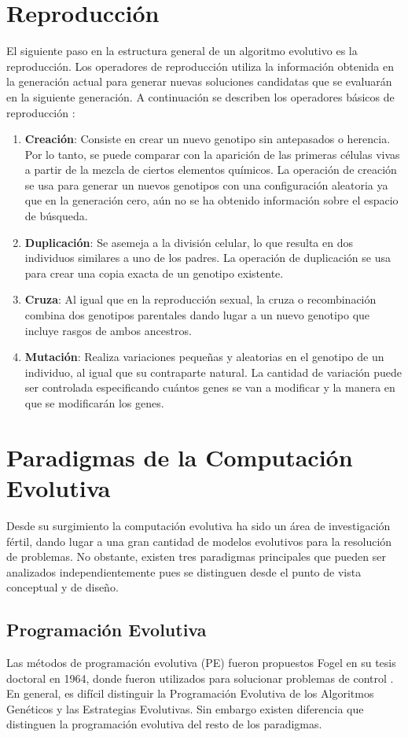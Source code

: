\section{Reproducción}\label{Reproduccion} 
El siguiente paso en la estructura general de un algoritmo evolutivo es la reproducción. Los operadores de reproducción utiliza la información obtenida en la generación actual para generar nuevas soluciones candidatas que se evaluarán en la siguiente generación. A continuación se describen los operadores básicos de reproducción \cite{weise2009global}:
\begin{enumerate}
\item \textbf{Creación}: Consiste en crear un nuevo genotipo sin antepasados o herencia. Por lo tanto, se puede comparar con la aparición de las primeras células vivas a partir de la mezcla de ciertos elementos químicos. La operación de creación se usa para generar un nuevos genotipos con una configuración aleatoria ya que en la generación cero, aún no se ha obtenido información sobre el espacio de búsqueda. 
\item \textbf{Duplicación}: Se asemeja a la división celular, lo que resulta en dos individuos similares a uno de los padres.  La operación de duplicación se usa para crear una copia exacta de un genotipo existente.
\item \textbf{Cruza}: Al igual que en la reproducción sexual, la cruza o recombinación combina dos genotipos parentales dando lugar a un nuevo genotipo que incluye rasgos de ambos ancestros. 

\item \textbf{Mutación}: Realiza variaciones pequeñas y aleatorias en el genotipo de un individuo, al igual que su contraparte natural. La cantidad de variación puede ser controlada especificando cuántos genes se van a modificar y la manera en que se modificarán los genes.
\end{enumerate}



\section{Paradigmas de la Computación Evolutiva}
Desde su surgimiento la computación evolutiva ha sido un área de investigación fértil, dando lugar a una gran cantidad de modelos evolutivos para la resolución de problemas. No obstante, existen tres paradigmas principales que pueden ser analizados independientemente pues se distinguen desde el punto de vista conceptual y de diseño. 
\subsection{Programación Evolutiva}
Las métodos de programación evolutiva (PE) fueron propuestos  Fogel  en su tesis doctoral en 1964, donde fueron utilizados para solucionar problemas de control \cite{fogel1993applying}. En general, es difícil distinguir la Programación Evolutiva de los Algoritmos Genéticos y las Estrategias Evolutivas. Sin embargo existen diferencia que distinguen la programación evolutiva del resto de los paradigmas.

